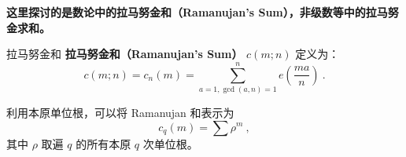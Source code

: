 

\textbf{这里探讨的是数论中的拉马努金和（Ramanujan's Sum），非级数等中的拉马努金求和。}

\begin{definition}{拉马努金和}
\textbf{拉马努金和（Ramanujan's Sum）} $c(m; n)$ 定义为：
\begin{equation}
c(m; n) = c_n(m) = \sum_{a=1, \gcd(a, n)=1}^{n} e\left(\frac{ma}{n}\right) ~.
\end{equation}
\end{definition}

\begin{theorem}{}
利用本原单位根，可以将 Ramanujan 和表示为
\begin{equation}
c_q(m) = \sum \rho^m~,
\end{equation}
其中 $\rho$ 取遍 $q$ 的所有本原 $q$ 次单位根。
\end{theorem}


